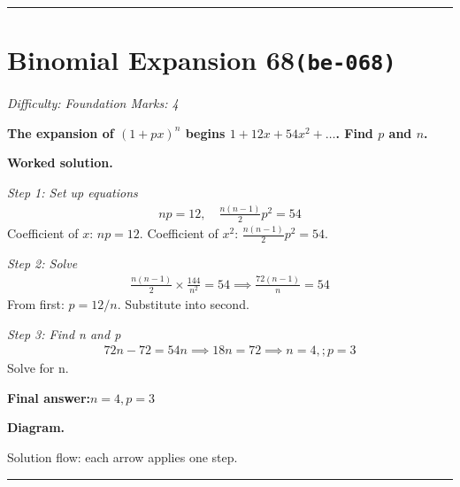 \documentclass[11pt]{article}
\newcommand{\question}[1]{\par\medskip\noindent\textbf{#1}\par}
\begin{document}
\medskip\hrule

\section*{Binomial Expansion 68\quad\small\texttt{(be-068)}}
\textit{Difficulty: Foundation \quad\textbar\quad Marks: 4}

\question{The expansion of \( (1 + px)^n \) begins \( 1 + 12x + 54x^2 + \ldots \). Find \( p \) and \( n \).}

\textbf{Worked solution.}

\textit{Step 1: Set up equations}
\[\begin{gathered}
np = 12, \quad \frac{n(n-1)}{2}p^2 = 54
\end{gathered}\]
Coefficient of \( x \): \( np = 12 \). Coefficient of \( x^2 \): \( \frac{n(n-1)}{2}p^2 = 54 \).

\textit{Step 2: Solve}
\[\begin{gathered}
\frac{n(n-1)}{2} \times \frac{144}{n^2} = 54 \implies \frac{72(n-1)}{n} = 54
\end{gathered}\]
From first: \( p = 12/n \). Substitute into second.

\textit{Step 3: Find n and p}
\[\begin{gathered}
72n - 72 = 54n \implies 18n = 72 \implies n = 4,; p = 3
\end{gathered}\]
Solve for n.

\begin{answerbox}
\textbf{Final answer:}\quad \(\displaystyle n = 4, p = 3\)
\end{answerbox}
\textbf{Diagram.}

\begin{center}
\end{center}
\small Solution flow: each arrow applies one step.\normalsize

\medskip\hrule
\end{document}
